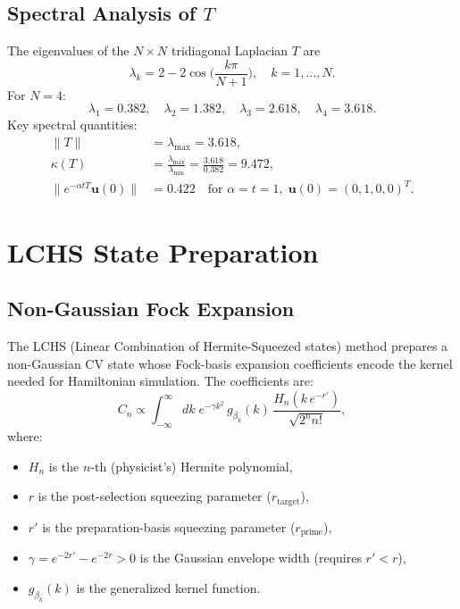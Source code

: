 \documentclass[11pt]{article}
\newcommand{\norm}[1]{\|{#1}\|}
\begin{document}
\subsection{Spectral Analysis of $T$}
The eigenvalues of the $N\times N$ tridiagonal Laplacian $T$ are
\begin{equation}\label{eq:eigvals}
\lambda_k = 2 - 2\cos\!\Big(\frac{k\pi}{N+1}\Big),\quad k=1,\ldots,N.
\end{equation}
For $N=4$:
\begin{equation}
\lambda_1 = 0.382,\quad \lambda_2 = 1.382,\quad \lambda_3 = 2.618,\quad \lambda_4 = 3.618.
\end{equation}
Key spectral quantities:
\begin{align}
\norm{T} &= \lambda_{\max} = 3.618, \\
\kappa(T) &= \frac{\lambda_{\max}}{\lambda_{\min}} = \frac{3.618}{0.382} = 9.472, \\
\norm{e^{-\alpha t T}\bm{u}(0)} &= 0.422 \quad\text{for }\alpha=t=1,\;\bm{u}(0)=(0,1,0,0)^T.
\end{align}

\section{LCHS State Preparation}

\subsection{Non-Gaussian Fock Expansion}
The LCHS (Linear Combination of Hermite-Squeezed states) method prepares a
non-Gaussian CV state whose Fock-basis expansion coefficients encode the kernel
needed for Hamiltonian simulation.  The coefficients are:
\begin{equation}\label{eq:cn}
C_n \propto \int_{-\infty}^{\infty} dk\;
  e^{-\gamma k^2}\,g_{\beta_k}(k)\,
  \frac{H_n(k\,e^{-r'})}{\sqrt{2^n n!}},
\end{equation}
where:
\begin{itemize}
\item $H_n$ is the $n$-th (physicist's) Hermite polynomial,
\item $r$ is the post-selection squeezing parameter ($r_{\mathrm{target}}$),
\item $r'$ is the preparation-basis squeezing parameter ($r_{\mathrm{prime}}$),
\item $\gamma = e^{-2r'} - e^{-2r} > 0$ is the Gaussian envelope width (requires $r' < r$),
\item $g_{\beta_k}(k)$ is the generalized kernel function.
\end{itemize}
\end{document}
